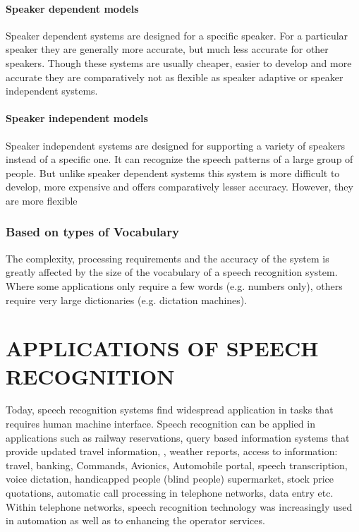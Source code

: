 \documentclass[a4paper,12pt]{report} %
\begin{document}
\paragraph{Speaker dependent models}
Speaker dependent systems are designed for a specific speaker. For a particular speaker they are generally more accurate, but much less accurate for other speakers. Though these systems are usually cheaper, easier to develop and more accurate they are comparatively not as flexible as speaker adaptive or speaker independent systems.
\paragraph{Speaker independent models}
Speaker independent systems are designed for supporting a variety of speakers instead of a specific one. It can recognize the speech patterns of a large group of people. But unlike speaker dependent systems this system is more difficult to develop, more expensive and offers comparatively lesser accuracy. However, they are more flexible
\subsubsection{Based on types of Vocabulary }
        The complexity, processing requirements and the accuracy of the system is greatly affected by the size of the vocabulary of a speech recognition system. Where some applications only require a few words (e.g. numbers only), others require very large dictionaries (e.g. dictation machines). 
\section{APPLICATIONS OF SPEECH RECOGNITION}
Today, speech recognition systems find widespread application in tasks that requires human machine interface. Speech recognition can be applied in applications such as railway reservations, query based information systems that provide updated travel information, , weather reports, access to information: travel, banking, Commands, Avionics, Automobile portal, speech transcription, voice dictation, handicapped people (blind people) supermarket, stock price quotations, automatic call processing in telephone networks, data entry etc. Within telephone networks, speech recognition technology was increasingly used in automation as well as to enhancing the operator services.
\end{document}
